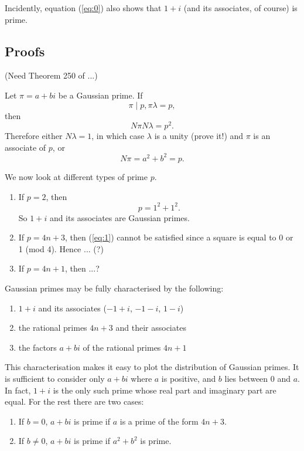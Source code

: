 \documentclass[a4paper]{article}
\begin{document}
Incidently, equation (\ref{eq:0}) also shows that $1 + i$ (and its associates, of course) is prime.

\subsection{Proofs}

(Need Theorem 250 of \cite{hardyandwright}...)

Let $\pi = a + bi$ be a Gaussian prime. If
\begin{displaymath}
\pi \mid p, \pi \lambda = p,
\end{displaymath}
then 
\begin{displaymath}
N\pi N\lambda = p^{2}.
\end{displaymath}
Therefore either $N\lambda = 1$, in which case $\lambda$ is a unity (prove it!) and $\pi$ is an associate
of $p$, or
\begin{equation} \label{eq:1}
N\pi = a^{2} + b^{2} = p.
\end{equation}

We now look at different types of prime $p$.

\begin{enumerate}
\item If $p = 2$, then
\begin{displaymath}
p = 1^{2} + 1^{2}.
\end{displaymath}
So $1 + i $ and its associates are Gaussian primes.
\item If $p = 4n + 3$, then (\ref{eq:1}) cannot be satisfied since a square is equal to 0 or 1 (mod 4).
Hence ... (?)
\item If $p = 4n + 1$, then ...?
\end{enumerate}

Gaussian primes may be fully characterised by the following:
\begin{enumerate}
\item $1 + i$ and its associates ($-1 + i$, $-1 - i$, $1 - i$) 
\item the rational primes $4n + 3$ and their associates 
\item the factors $a + bi$ of the rational primes $4n + 1$ 
\end{enumerate}

This characterisation makes it easy to plot the distribution of Gaussian primes.
It is sufficient to consider only $a + bi$ where $a$ is positive, and $b$ lies between 0 and $a$.
In fact, $1 + i$ is the only such prime whose real part and imaginary part are equal.
For the rest there are two cases: 
\begin{enumerate}
\item If $b = 0$, $a + bi$ is prime if $a$ is a prime of the form $4n + 3$. 
\item If $b \neq 0$, $a + bi$ is prime if $a^{2} + b^{2}$ is prime. 
\end{enumerate}
\end{document}
